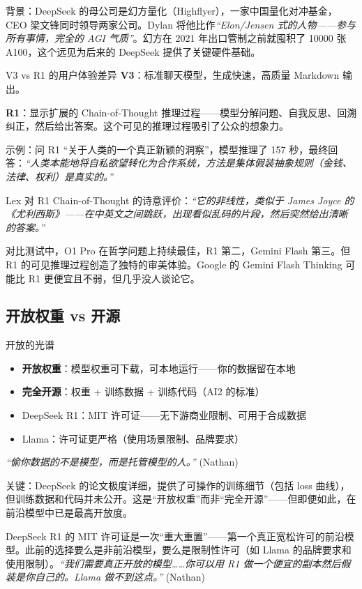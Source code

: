 \documentclass[a4paper]{article}
\begin{document}
背景：DeepSeek 的母公司是幻方量化（Highflyer），一家中国量化对冲基金，CEO 梁文锋同时领导两家公司。Dylan 将他比作\textit{``Elon/Jensen 式的人物——参与所有事情，完全的 AGI 气质''}。幻方在 2021 年出口管制之前就囤积了 10000 张 A100，这个远见为后来的 DeepSeek 提供了关键硬件基础。

\begin{importantbox}{V3 vs R1 的用户体验差异}
\textbf{V3}：标准聊天模型，生成快速，高质量 Markdown 输出。

\textbf{R1}：显示扩展的 Chain-of-Thought 推理过程——模型分解问题、自我反思、回溯纠正，然后给出答案。这个可见的推理过程吸引了公众的想象力。

示例：问 R1 ``关于人类的一个真正新颖的洞察''，模型推理了 157 秒，最终回答：\textit{``人类本能地将自私欲望转化为合作系统，方法是集体假装抽象规则（金钱、法律、权利）是真实的。''}

Lex 对 R1 Chain-of-Thought 的诗意评价：\textit{``它的非线性，类似于 James Joyce 的《尤利西斯》——在中英文之间跳跃，出现看似乱码的片段，然后突然给出清晰的答案。''}

对比测试中，O1 Pro 在哲学问题上持续最佳，R1 第二，Gemini Flash 第三。但 R1 的可见推理过程创造了独特的审美体验。Google 的 Gemini Flash Thinking 可能比 R1 更便宜且不弱，但几乎没人谈论它。
\end{importantbox}

\subsection{开放权重 vs 开源}

\begin{knowledgebox}{开放的光谱}
\begin{itemize}
    \item \textbf{开放权重}：模型权重可下载，可本地运行——你的数据留在本地
    \item \textbf{完全开源}：权重 + 训练数据 + 训练代码（AI2 的标准）
    \item DeepSeek R1：MIT 许可证——无下游商业限制、可用于合成数据
    \item Llama：许可证更严格（使用场景限制、品牌要求）
\end{itemize}

\textit{``偷你数据的不是模型，而是托管模型的人。''} (Nathan)

关键：DeepSeek 的论文极度详细，提供了可操作的训练细节（包括 loss 曲线），但训练数据和代码并未公开。这是``开放权重''而非``完全开源''——但即便如此，在前沿模型中已是最高开放度。

DeepSeek R1 的 MIT 许可证是一次``重大重置''——第一个真正宽松许可的前沿模型。此前的选择要么是非前沿模型，要么是限制性许可（如 Llama 的品牌要求和使用限制）。\textit{``我们需要真正开放的模型……你可以用 R1 做一个便宜的副本然后假装是你自己的。Llama 做不到这点。''} (Nathan)
\end{knowledgebox}
\end{document}
